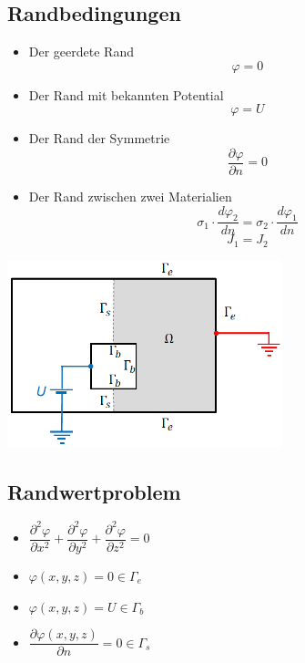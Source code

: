 \subsection{Randbedingungen}
\begin{minipage}{8cm}
	\begin{itemize}
		\item Der geerdete Rand \[\varphi = 0\]
		\item Der Rand mit bekannten Potential \[ \varphi = U \]
		\item Der Rand der Symmetrie \[ \dfrac{\partial\varphi}{\partial n} = 0\]
		\item Der Rand zwischen zwei Materialien \[\sigma_{1} \cdot \frac{d \varphi_{2}}{dn}=\sigma_{2} \cdot \frac{d \varphi_{1}}{dn}\]
		\[J_{1}=J_{2}\]
	\end{itemize}
\end{minipage}
\begin{minipage}{8cm}
	\includegraphics[width=8cm]{images/randbedinung_ES.png}
\end{minipage}
\subsection{Randwertproblem}
\begin{multicols}{2}
	\begin{itemize}
		\item $\dfrac{\partial^2\varphi}{\partial x^2} +  \dfrac{\partial^2\varphi}{\partial y^2} + \dfrac{\partial^2\varphi}{\partial z^2}=0 $
		\item $\varphi(x,y,z)=0 \in \Gamma_e$
		\item $\varphi(x,y,z)=U \in \Gamma_b$
		\item $ \dfrac{\partial\varphi(x,y,z)}{\partial n} = 0 \in \Gamma_s$
	\end{itemize}
\end{multicols}
